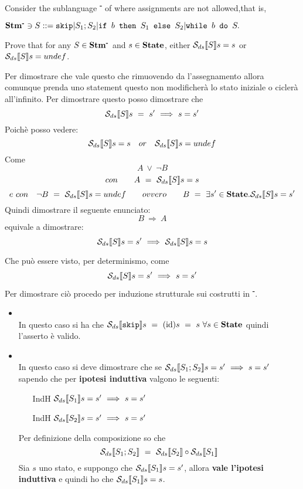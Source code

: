 \newcommand{\stmminus}{\stm{}\textsuperscript{\textbf{-}}}

{
    Consider the sublanguage \stmminus{} of \stm{} where assignments are not allowed,that is,
    \begin{center}
    $\stmminus{} \ni{} S ::= \skipistr | S_1;S_2 | \ifABC{b}{S_1}{S_2} | \wbS{b}{S}.$
    \end{center}
    Prove that for any $S\in\stmminus{}$ and $s\in\mbox{\textbf{State}}$, either $\mathcal{S}_{ds}\llbracket S \rrbracket{}s=s$ or $\mathcal{S}_{ds}\llbracket S \rrbracket{}s=undef$.
}
{
    Per dimostrare che vale questo che rimuovendo da \stm{} l'assegnamento
    allora comunque prenda uno statement questo non modificherà lo stato
    iniziale o ciclerà all'infinito. Per dimostrare questo posso dimostrare che 
    \[ \mathcal{S}_{ds}\llbracket S \rrbracket{}s~=~s'~\Longrightarrow~s=s' \]
    Poichè posso vedere: 
    \[ \mathcal{S}_{ds}\llbracket S \rrbracket{}s=s \quad or \quad \mathcal{S}_{ds}\llbracket S \rrbracket{}s=undef \]
    Come
    \[ A~\lor~\neg{}B \]
    \[ con \qquad A~=~\mathcal{S}_{ds}\llbracket S \rrbracket{}s=s \]
  \[  e~con \quad \neg{}B~=~\mathcal{S}_{ds}\llbracket S \rrbracket{}s=undef \qquad ovvero \qquad    B~=~\exists{}s'\in\mbox{\textbf{State}}.\mathcal{S}_{ds}\llbracket S \rrbracket{}s=s' \]
    Quindi dimostrare il seguente enunciato:
    \[ B~\Longrightarrow~A \]
    equivale a dimostrare: 
\[ \mathcal{S}_{ds}\llbracket S \rrbracket{}s=s'~\Longrightarrow~\mathcal{S}_{ds}\llbracket S \rrbracket{}s=s \]

    Che può essere visto, per determinismo, come
    \[ \mathcal{S}_{ds}\llbracket S \rrbracket{}s=s'~\Longrightarrow~s=s' \]
    Per dimostrare ciò procedo per induzione strutturale sui costrutti in 
    \stmminus{}.

\begin{itemize}
	\item {} \\
	In questo caso si ha che $\mathcal{S}_{ds}\llbracket \textrm{\normalfont{\texttt{skip}}} \rrbracket s~
    =~(\textrm{\normalfont{id}})s~=~s~\forall{}s\in\mbox{\textbf{State}}$ quindi l'asserto è valido.

   \item {} \\
    In questo caso si deve dimostrare che
    se $\mathcal{S}_{ds}\llbracket S_1;S_2 \rrbracket s=s'~\Longrightarrow~s=s'$ sapendo che per \textbf{ipotesi
    induttiva} valgono le seguenti:
 \begin{itemize}
    \item[IndH] $\mathcal{S}_{ds}\llbracket S_1 \rrbracket s=s'~\Longrightarrow~s=s'$
    \item[IndH] $\mathcal{S}_{ds}\llbracket S_2 \rrbracket s=s'~\Longrightarrow~s=s'$
 \end{itemize}
    Per definizione della composizione so che 
    \[ \mathcal{S}_{ds}\llbracket S_1;S_2 \rrbracket~=~\mathcal{S}_{ds}\llbracket S_2 \rrbracket \circ \mathcal{S}_{ds}\llbracket S_1 \rrbracket \]
    Sia $s$ uno stato,
    e suppongo che $\mathcal{S}_{ds}\llbracket S_1 \rrbracket s=s'$, allora \textbf{vale l'ipotesi induttiva} e quindi
    ho che $\mathcal{S}_{ds}\llbracket S_1 \rrbracket s=s$. 
    

\end{itemize}}
